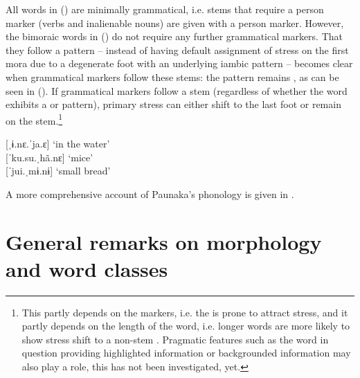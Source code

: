 All words in () are minimally grammatical, i.e. stems that require a person marker (verbs and inalienable nouns) are given with a person marker. However, the bimoraic words in () do not require any further grammatical markers. That they follow a  pattern – instead of having default assignment of stress on the first mora due to a degenerate foot with an underlying iambic pattern – becomes clear when grammatical markers follow these stems: the pattern remains , as can be seen in (). If grammatical markers follow a stem (regardless of whether the word exhibits a  or  pattern), primary stress can either shift to the last foot or remain on the stem.\footnote{This partly depends on the markers, i.e. the  is prone to attract stress, and it partly depends on the length of the word, i.e. longer words are more likely to show stress shift to a non-stem . Pragmatic features such as the word in question providing highlighted information or backgrounded information may also play a role, this has not been investigated, yet.}

\ea\label{ex:Sketch-Troch-Markers}
    {[}ˌɨ.nɛ.ˈja.ɛ] \tab\tab ‘in the water’\\
    {[}ˈku.su.ˌhã.nɛ] \tab ‘mice’\\
    {[}ˈjui.ˌmɨ.nɨ] \tab\tab ‘small bread’\\
\xe
{}

A more comprehensive account of Paunaka’s phonology is given in .
\renewcommand{\exfont}{\normalsize\itshape}

\section{General remarks on morphology and word classes}\label{sec:O_GeneralRemarksMorphology}

